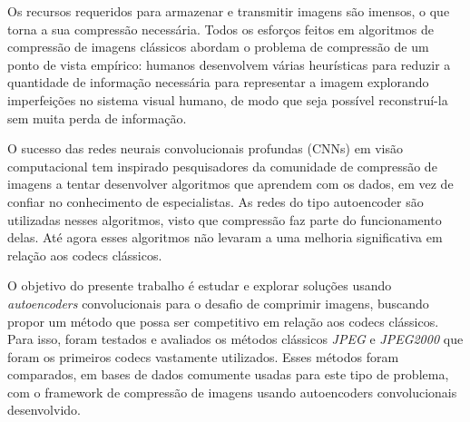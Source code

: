Os recursos requeridos para armazenar e transmitir imagens são imensos, o que torna a sua compressão necessária. Todos os esforços feitos em algoritmos de compressão de imagens clássicos abordam o problema de compressão de um ponto de vista empírico: humanos desenvolvem várias heurísticas para reduzir a quantidade de informação necessária para representar a imagem explorando imperfeições no sistema visual humano, de modo que seja possível reconstruí-la sem muita perda de informação. 

O sucesso das redes neurais convolucionais profundas (CNNs) em visão computacional tem inspirado pesquisadores da comunidade de compressão de imagens a tentar desenvolver algoritmos que aprendem com os dados, em vez de confiar no conhecimento de especialistas. As redes do tipo autoencoder são utilizadas nesses algoritmos, visto que compressão faz parte do funcionamento delas. Até agora esses algoritmos não levaram a uma melhoria significativa em relação aos codecs clássicos.

O objetivo do presente trabalho é estudar e explorar soluções usando \textit{autoencoders} convolucionais para o desafio de comprimir imagens, buscando propor um método que possa ser competitivo em relação aos codecs clássicos. Para isso, foram testados e avaliados os métodos clássicos \textit{JPEG} e \textit{JPEG2000} que foram os primeiros codecs vastamente utilizados. Esses métodos foram comparados, em bases de dados comumente usadas para este tipo de problema, com o framework de compressão de imagens usando autoencoders convolucionais desenvolvido.


